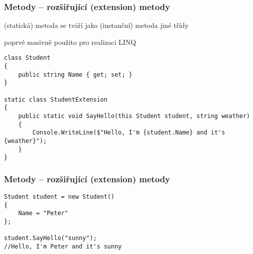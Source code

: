 \begin{frame}[fragile]
\frametitle{Metody -- rozšiřující (extension) metody}

\begin{bitemize}{}
\item (statická) metoda se tváří jako (instanční) metoda jiné třídy
\item poprvé masivně použito pro realizaci LINQ
\end{bitemize}
\vfill
\begin{yesblock}
\begin{lstlisting}[basicstyle=\small]
class Student
{
    public string Name { get; set; }
}

static class StudentExtension
{
    public static void SayHello(this Student student, string weather)
    {
        Console.WriteLine($"Hello, I'm {student.Name} and it's {weather}");
    }
}
\end{lstlisting}
\end{yesblock}
\end{frame}

\begin{frame}[fragile]
\frametitle{Metody -- rozšiřující (extension) metody}
\begin{yesblock}
\begin{lstlisting}[basicstyle=\small]
Student student = new Student()
{
    Name = "Peter"
};

student.SayHello("sunny");
//Hello, I'm Peter and it's sunny
\end{lstlisting}
\end{yesblock}
\end{frame}


\zkouskove